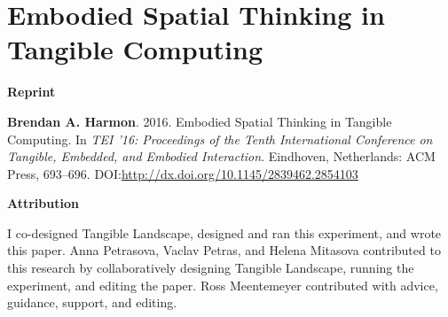 \chapter{Embodied Spatial Thinking in Tangible Computing}
\label{chap-two}

\textbf{Reprint}

\textbf{Brendan A. Harmon}. 2016. Embodied Spatial Thinking in Tangible Computing. In \emph{TEI ’16: Proceedings of the Tenth International Conference on Tangible, Embedded, and Embodied Interaction}. Eindhoven, Netherlands: ACM Press, 693–696. DOI:\url{http://dx.doi.org/10.1145/2839462.2854103}


\textbf{Attribution}

I co-designed Tangible Landscape,
designed and ran this experiment,
and wrote this paper.
%
Anna Petrasova, Vaclav Petras, and Helena Mitasova
contributed to this research by
collaboratively designing Tangible Landscape,
running the experiment,
and editing the paper.
%
Ross Meentemeyer
contributed with advice, guidance, support, and editing.

\vfil
\pagebreak

%
%
